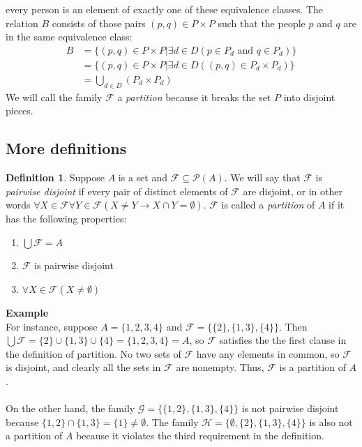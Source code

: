 \documentclass{report}
\theoremstyle{definition}
\newtheorem*{definition}{Definition}
\begin{document}
every person is an element of exactly one of these equivalence classes. The relation $B$ consists
of those pairs $(p,q)\in P\times P$ such that the people $p$ and $q$ are in the same equivalence class:
\begin{align*}
B&=\{(p,q)\in P\times P|\exists d\in D(p\in P_d\text{ and }q\in P_d)\}\\
&=\{(p,q)\in P\times P|\exists d\in D((p,q)\in P_d\times P_d)\}\\
&=\bigcup_{d\in D}(P_d\times P_d)
\end{align*}
We will call the family $\mathcal F$ a \textit{partition} because it breaks the set $P$ into disjoint pieces.
\newpage

\subsection{More definitions}
\begin{definition}
Suppose $A$ is a set and $\mathcal F\subseteq\mathscr P(A)$. We will say that $\mathcal F$ is \textit{pairwise disjoint} if every pair of distinct elements of $\mathcal F$ are disjoint, or in other
words $\forall X\in\mathcal F\forall Y\in\mathcal F(X\neq Y\to X\cap Y=\emptyset)$. $\mathcal F$ is called a \textit{partition} of $A$ if it has the following properties:
\begin{enumerate}
\item $\bigcup\mathcal F=A$
\item $\mathcal F$ is pairwise disjoint
\item $\forall X\in\mathcal F(X\neq\emptyset)$
\end{enumerate}
\end{definition}
\noindent\textbf{Example}\\
For instance, suppose $A=\{1,2,3,4\}$ and $\mathcal F=\{\{2\},\{1,3\},\{4\}\}$. Then $\bigcup\mathcal F=\{2\}\cup\{1,3\}\cup\{4\}=\{1,2,3,4\}=A$, so $\mathcal F$ satisfies the the first clause in
the definition of partition.
No two sets of $\mathcal F$ have any elements in common, so $\mathcal F$ is disjoint, and clearly all the sets in $\mathcal F$ are nonempty. Thus, $\mathcal F$ is a partition of $A$.\\
\vspace{1mm}\\
On the other hand, the family $\mathcal G=\{\{1,2\},\{1,3\},\{4\}\}$ is not pairwise disjoint because $\{1,2\}\cap\{1,3\}=\{1\}\neq\emptyset$. The family 
$\mathcal H=\{\emptyset,\{2\},\{1,3\},\{4\}\}$ is also not a partition of $A$ because it violates the third requirement in the definition.
\end{document}
